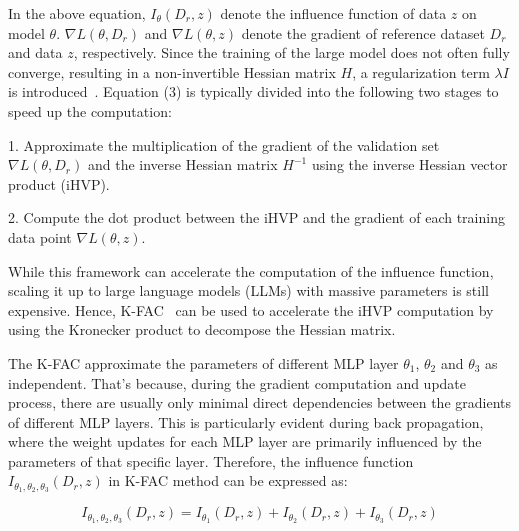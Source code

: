 \documentclass{article} %
\begin{document}

In the above equation, $I_\theta(D_r,z)$ denote the influence function of data $z$ on model $\theta$. $\nabla L(\theta,D_r)$ and $\nabla L(\theta,z)$ denote the gradient of reference dataset $D_r$ and data $z$, respectively. Since the training of the large model  does not often fully converge, resulting in a non-invertible Hessian matrix $H$, a regularization term $\lambda I$ is introduced~\citep{bae2022if}. Equation (3) is typically divided into the following two stages to speed up the computation:

1. Approximate the multiplication of the gradient of the validation set $\nabla L(\theta,D_r)$ and the inverse Hessian matrix $H^{-1}$  using the inverse Hessian vector product (iHVP).

2. Compute the dot product between the iHVP and the gradient of each training data point $\nabla L(\theta,z)$.

While this framework can accelerate the computation of the influence function, scaling it up to large language models (LLMs) with massive parameters is still expensive. Hence, K-FAC~\citep{martens2015optimizing, ueno2020rich} can be used to accelerate the iHVP computation by using the Kronecker product to decompose the Hessian matrix.

The K-FAC approximate the parameters of different MLP layer $\theta_1$, $\theta_2$ and $\theta_3$ as independent. That's because, during the gradient computation and update process, there are usually only minimal direct dependencies between the gradients of different MLP layers. This is particularly evident during back propagation, where the weight updates for each MLP layer are primarily influenced by the parameters of that specific layer. Therefore, the influence function $I_{\theta_1, \theta_2, \theta_3}(D_r, z)$ in K-FAC method can be expressed as:

\begin{equation}
    I_{\theta_1, \theta_2, \theta_3}(D_r, z) = I_{\theta_1}(D_r, z) + I_{\theta_2}(D_r, z) + I_{\theta_3}(D_r, z)
\end{equation}
\end{document}
